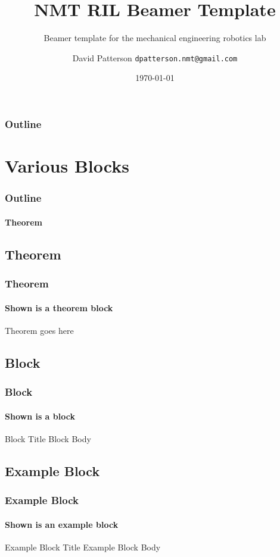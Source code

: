 \documentclass[compress, xcolor = svgnames, t]{beamer}
\title{NMT RIL Beamer Template}
\subtitle{Beamer template for the mechanical engineering robotics lab}
\author[DP]{David Patterson \texttt{dpatterson.nmt@gmail.com}}
\institute[NMT]{New Mexico Institute of Technology}
\date{\today}
\begin{document}
\begin{frame}[c]
\titlepage
\end{frame}

\begin{frame}\frametitle{Outline}
	\tableofcontents[hidesubsections]
\end{frame}

\section{Various Blocks} %
\label{sec:various_blocks}

\begin{frame}\frametitle{Outline}\framesubtitle{Theorem}
\end{frame}

\subsection{Theorem} %
\label{sub:theorem}

\begin{frame}\frametitle{Theorem}\framesubtitle{Shown is a theorem block} 
\begin{theorem}
Theorem goes here
\end{theorem}
\end{frame}


\subsection{Block} %
\label{sub:block}

\begin{frame}\frametitle{Block}\framesubtitle{Shown is a block} 
\begin{block}{Block Title}
Block Body
\end{block}
\end{frame}


\subsection{Example Block} %
\label{sub:example_block}

\begin{frame}\frametitle{Example Block}\framesubtitle{Shown is an example block}
\begin{example}{Example Block Title}
Example Block Body
\end{example}
\end{frame}
\end{document}
